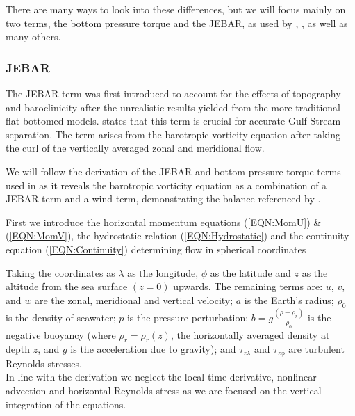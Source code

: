 \documentclass[..\report.tex]{subfiles}
\begin{document}
There are many ways to look into these differences, but we will focus mainly on two terms, the bottom pressure torque and the \gls{JEBAR}, as used by \citet{Greatbatch1991}, \citet{Bell1999}, \citet{Gula2014} as well as many others. 


\subsubsection{\acrfull{JEBAR}}
\label{SSSEC:JEBAR}

The \gls{JEBAR} term was first introduced to account for the effects of topography and baroclinicity after the unrealistic results yielded from the more traditional flat-bottomed models. \citet{Meyers1996} states that this term is crucial for accurate Gulf Stream separation.
The term arises from the barotropic vorticity equation after taking the curl of the vertically averaged zonal and meridional flow.
\par
We will follow the derivation of the \gls{JEBAR} and bottom pressure torque terms used in \citet{Greatbatch1991} as it reveals the barotropic vorticity equation as a combination of a \gls{JEBAR} term and a wind term, demonstrating the balance referenced by \citet{NaveiraGarabato2013}.

First we introduce the horizontal momentum equations (\ref{EQN:MomU}) \& (\ref{EQN:MomV}), the hydrostatic relation (\ref{EQN:Hydrostatic}) and the continuity equation (\ref{EQN:Continuity}) determining flow in spherical coordinates






Taking the coordinates as $\lambda$ as the longitude, $\phi$ as the latitude and $z$ as the altitude from the sea surface $\left(z=0\right)$ upwards.
The remaining terms are: $u$, $v$, and $w$ are the zonal, meridional and vertical velocity; $a$ is the Earth's radius; $\rho_0$ is the density of seawater; $p$ is the pressure perturbation; $b=g\frac{\left(\rho-\rho_r\right)}{\rho_0}$ is the negative buoyancy (where $\rho_r=\rho_r(z)$, the horizontally averaged density at depth $z$, and $g$ is the acceleration due to gravity); and $\tau_{z\lambda}$ and $\tau_{z\phi}$ are turbulent Reynolds stresses.\\
In line with the \citet{Greatbatch1991} derivation 
we neglect the local time derivative, nonlinear advection and horizontal Reynolds stress as we are focused on the vertical integration of the equations.
\end{document}
